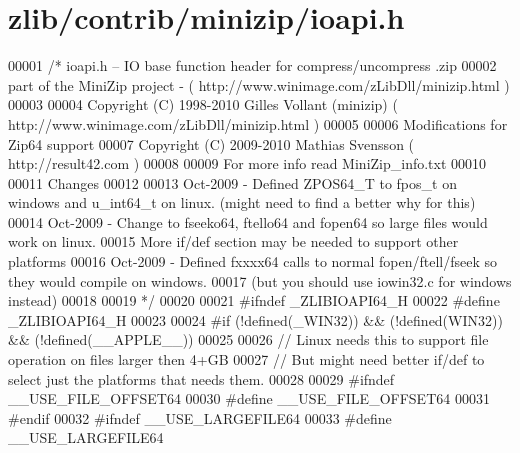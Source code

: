 \hypertarget{zlib_2contrib_2minizip_2ioapi_8h_source}{}\section{zlib/contrib/minizip/ioapi.h}
\label{zlib_2contrib_2minizip_2ioapi_8h_source}

\begin{DoxyCode}
00001 \textcolor{comment}{/* ioapi.h -- IO base function header for compress/uncompress .zip}
00002 \textcolor{comment}{   part of the MiniZip project - ( http://www.winimage.com/zLibDll/minizip.html )}
00003 \textcolor{comment}{}
00004 \textcolor{comment}{         Copyright (C) 1998-2010 Gilles Vollant (minizip) ( http://www.winimage.com/zLibDll/minizip.html )}
00005 \textcolor{comment}{}
00006 \textcolor{comment}{         Modifications for Zip64 support}
00007 \textcolor{comment}{         Copyright (C) 2009-2010 Mathias Svensson ( http://result42.com )}
00008 \textcolor{comment}{}
00009 \textcolor{comment}{         For more info read MiniZip\_info.txt}
00010 \textcolor{comment}{}
00011 \textcolor{comment}{         Changes}
00012 \textcolor{comment}{}
00013 \textcolor{comment}{    Oct-2009 - Defined ZPOS64\_T to fpos\_t on windows and u\_int64\_t on linux. (might need to find a better
       why for this)}
00014 \textcolor{comment}{    Oct-2009 - Change to fseeko64, ftello64 and fopen64 so large files would work on linux.}
00015 \textcolor{comment}{               More if/def section may be needed to support other platforms}
00016 \textcolor{comment}{    Oct-2009 - Defined fxxxx64 calls to normal fopen/ftell/fseek so they would compile on windows.}
00017 \textcolor{comment}{                          (but you should use iowin32.c for windows instead)}
00018 \textcolor{comment}{}
00019 \textcolor{comment}{*/}
00020 
00021 \textcolor{preprocessor}{#ifndef \_ZLIBIOAPI64\_H}
00022 \textcolor{preprocessor}{#define \_ZLIBIOAPI64\_H}
00023 
00024 \textcolor{preprocessor}{#if (!defined(\_WIN32)) && (!defined(WIN32)) && (!defined(\_\_APPLE\_\_))}
00025 
00026   \textcolor{comment}{// Linux needs this to support file operation on files larger then 4+GB}
00027   \textcolor{comment}{// But might need better if/def to select just the platforms that needs them.}
00028 
00029 \textcolor{preprocessor}{        #ifndef \_\_USE\_FILE\_OFFSET64}
00030 \textcolor{preprocessor}{                #define \_\_USE\_FILE\_OFFSET64}
00031 \textcolor{preprocessor}{        #endif}
00032 \textcolor{preprocessor}{        #ifndef \_\_USE\_LARGEFILE64}
00033 \textcolor{preprocessor}{                #define \_\_USE\_LARGEFILE64}

\end{DoxyCode}
